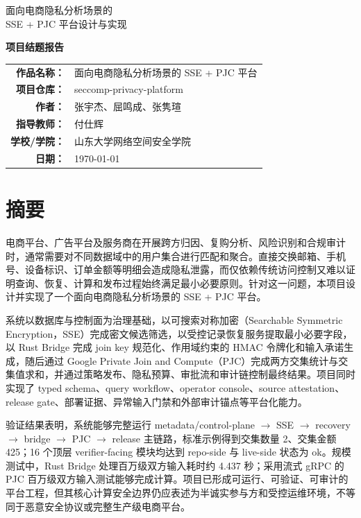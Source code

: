 \documentclass[UTF8,a4paper,12pt,oneside]{ctexrep}
\newcommand{\project}{seccomp-privacy-platform}
\newcommand{\pipeline}{metadata/control-plane $\rightarrow$ SSE $\rightarrow$ recovery $\rightarrow$ bridge $\rightarrow$ PJC $\rightarrow$ release}
\begin{document}
\begin{titlepage}
  \centering
  \vspace*{1.5cm}
  {\heiti 面向电商隐私分析场景的\\[0.3em]SSE + PJC 平台设计与实现\par}
  \vspace{3.2cm}
  {\bfseries 项目结题报告\par}
  \vspace{5.2cm}
  \begin{tabular}{>{\bfseries}r l}
    作品名称： & 面向电商隐私分析场景的 SSE + PJC 平台 \\
    项目仓库： & \project \\
    作者： & 张宇杰、屈鸣成、张隽瑄 \\
    指导教师： & 付仕辉 \\
    学校/学院： & 山东大学网络空间安全学院 \\
    日期： & \today \\
  \end{tabular}
  \vfill

\end{titlepage}


\chapter*{摘要}

电商平台、广告平台及服务商在开展跨方归因、复购分析、风险识别和合规审计时，通常需要对不同数据域中的用户集合进行匹配和聚合。直接交换邮箱、手机号、设备标识、订单金额等明细会造成隐私泄露，而仅依赖传统访问控制又难以证明查询、恢复、计算和发布过程始终满足最小必要原则。针对这一问题，本项目设计并实现了一个面向电商隐私分析场景的 SSE + PJC 平台。

系统以数据库与控制面为治理基础，以可搜索对称加密（Searchable Symmetric Encryption，SSE）完成密文候选筛选，以受控记录恢复服务提取最小必要字段，以 Rust Bridge 完成 join key 规范化、作用域约束的 HMAC 令牌化和输入承诺生成，随后通过 Google Private Join and Compute（PJC）完成两方交集统计与交集值求和，并通过策略发布、隐私预算、审批流和审计链控制最终结果。项目同时实现了 typed schema、query workflow、operator console、source attestation、release gate、部署证据、异常输入门禁和外部审计锚点等平台化能力。

验证结果表明，系统能够完整运行 \pipeline{} 主链路，标准示例得到交集数量 2、交集金额 425；16 个顶层 verifier-facing 模块均达到 repo-side 与 live-side 状态为 ok。规模测试中，Rust Bridge 处理百万级双方输入耗时约 4.437 秒；采用流式 gRPC 的 PJC 百万级双方输入测试能够完成计算。项目已形成可运行、可验证、可审计的平台工程，但其核心计算安全边界仍应表述为半诚实参与方和受控运维环境，不等同于恶意安全协议或完整生产级电商平台。
\end{document}
